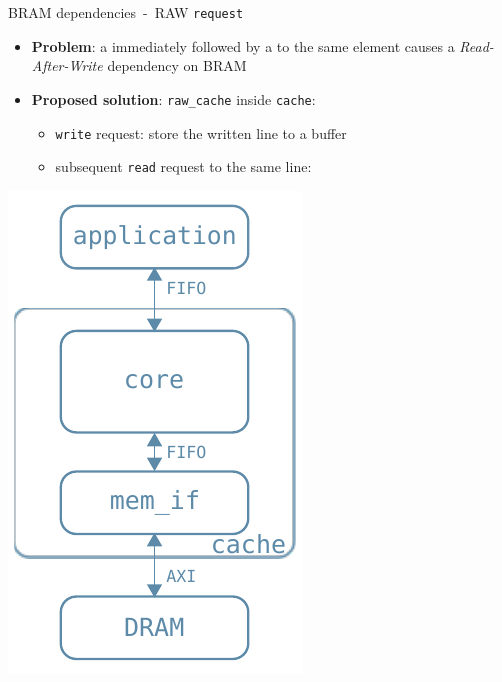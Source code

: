 \documentclass[handout]{beamer}
\begin{document}
\begin{frame}{BRAM dependencies~-~RAW \texttt{request}}
	\begin{minipage}{.7\textwidth}
		\begin{itemize}[<+->]
			\item \textbf{Problem}:
				a  immediately
				followed by a 
				to the same element causes a \emph{Read-After-Write}
				dependency on BRAM
			\item \textbf{Proposed solution}:
				\texttt{raw\_cache} inside \texttt{cache}:
				\begin{itemize}[<.->]
					\item \texttt{write} request: store the
						written line to a buffer
					\item subsequent \texttt{read} request to
						the same line: 
				\end{itemize}
		\end{itemize}
	\end{minipage}
	\begin{minipage}{.28\textwidth}
		\begin{center}
			\includegraphics[width=.9\textwidth]{internal_arch.pdf}
		\end{center}
	\end{minipage}
\end{frame}
\end{document}
